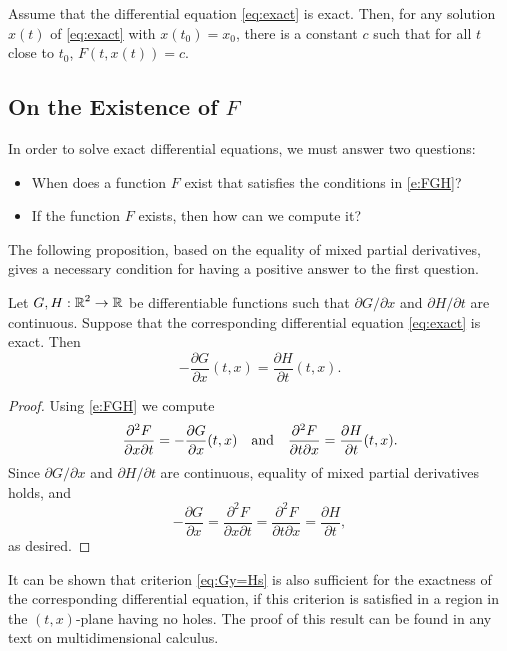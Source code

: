 \documentclass{ximera}
\begin{document}
\begin{theorem} \label{thm:exact}
Assume that the differential equation \eqref{eq:exact} is exact.  Then, for any 
solution $x(t)$ of \eqref{eq:exact} with $x(t_0)=x_0$, there is a constant $c$ 
such that for all $t$ close to $t_0$, $F(t,x(t)) = c$.
\end{theorem}

\subsection*{On the Existence of $F$}

In order to solve exact differential equations,
 we must answer two 
questions: 
\begin{itemize}
\item When does a function $F$ exist that satisfies the 
conditions in \eqref{e:FGH}?
\item If the function $F$ exists, then how can we compute it?
\end{itemize}
The following proposition, based on the equality of mixed partial derivatives, 
gives a necessary condition for having a positive answer to the first question.

\begin{proposition} \label{prop:exact}
Let $G,H:\mbox{$\Bbb{R}$}^2\to\mbox{$\Bbb{R}$}$ be differentiable functions such that
$\partial G/\partial x$ and $\partial H/\partial t$ are
continuous.  Suppose that the corresponding differential
equation \eqref{eq:exact} is exact.  Then
\begin{equation} \label{eq:Gy=Hs}
-\frac{\partial G}{\partial x} (t,x) = \frac{\partial H}{\partial
t} (t,x).
\end{equation}
\end{proposition}

\begin{proof} Using \eqref{e:FGH} we compute
\[
\frac{\partial^2 F}{\partial x\partial t} = 
-\frac{\partial G}{\partial x} (t,x) \quad\mbox{and}\quad 
\frac{\partial^2 F}{\partial t\partial x} = 
\frac{\partial H}{\partial t} (t,x).
\]
Since $\partial G/\partial x$ and $\partial H/\partial t$ are
continuous, equality of mixed partial derivatives holds, and
\[
-\frac{\partial G}{\partial x} = 
\frac{\partial^2 F}{\partial x\partial t} =
\frac{\partial^2 F}{\partial t\partial x} =
\frac{\partial H}{\partial t},
\]
as desired. \end{proof}

\begin{remark} \label{rmk:exact}
{\rm It can be shown that criterion \eqref{eq:Gy=Hs} is also
sufficient for the exactness of the corresponding differential
equation, if this criterion is satisfied in a region in the
$(t,x)$-plane having no holes. The proof of this result can be
found in any text on multidimensional calculus.}
\end{remark}
\end{document}
